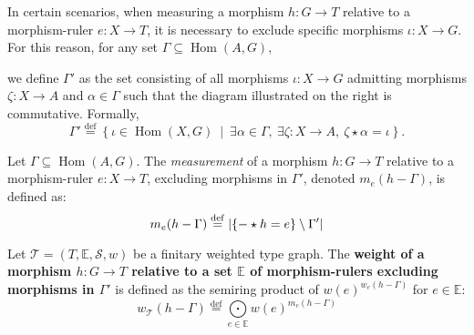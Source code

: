 In certain scenarios, when measuring a morphism $h :G\to T$ relative to a morphism-ruler $e:X \to T$, it is necessary to exclude specific morphisms $\iota :X \to G$. For this reason, for any set \( \Gamma \subseteq \operatorname{Hom}(A, G) \),

\noindent
\begin{minipage}{0.6\textwidth}
    we define $\Gamma'$ as the set consisting of all morphisms \( \iota : X \to G \) admitting morphisms \( \zeta \colon X \to A \) and \( \alpha \in \Gamma \) such that the diagram illustrated on the right is commutative. Formally,  
    \[
    \Gamma' \overset{\operatorname{def}}{=} \left\{ \iota \in \operatorname{Hom}(X, G)~\middle|~\exists \alpha \in \Gamma,~\exists \zeta:X \to A,~\zeta \star \alpha = \iota \right\}. 
    \]
\end{minipage}
\begin{minipage}{0.4\textwidth}
    \hfill 
\end{minipage}

\begin{definition}
    \label{def:weight_excluding_pre}
    Let \( \Gamma \subseteq \operatorname{Hom}(A, G) \).
    The \emph{measurement} of a morphism \( h:G \to T \) relative to a morphism-ruler \( e: X \to T \), excluding morphisms in \( \Gamma' \), denoted $m_e(h-\Gamma)$, is defined as:
    \[
        m_e(h-\Gamma) \overset{\operatorname{def}}{=} 
            |\{- \star h = e\} \setminus \Gamma'|
    \]
\end{definition}
\begin{definition}
    \label{def:weight_excluding}
    Let $\mathcal{T}=(T,\mathbb{E},\mathcal{S},w)$ be a finitary weighted type graph. The \textbf{weight of a morphism $h: G \to T$ relative to a set $\mathbb{E}$ of morphism-rulers excluding morphisms in \( \Gamma' \)} is defined as the semiring product of $w(e)^{w_e(h-\Gamma)}$ for $e \in \mathbb{E}$:
    \[ 
        w_\mathcal{T}(h-\Gamma) \overset{\operatorname{def}}{=} \underset{e \in \mathbb{E}}{\bigodot} 
    w(e)^{m_e(h-\Gamma)}
            \]
\end{definition}


